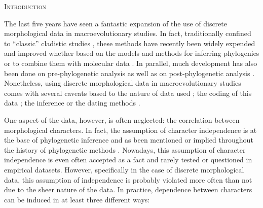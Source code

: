 \documentclass[12pt,letterpaper]{article}
\renewcommand{\section}[1]{%
\bigskip
\begin{center}
\begin{Large}
\normalfont\scshape #1
\medskip
\end{Large}
\end{center}}
\begin{document}
\section{Introduction}

The last five years have seen a fantastic expansion of the use of discrete morphological data in macroevolutionary studies.
In fact, traditionally confined to ``classic'' cladistic studies \citep{felsenstein2004inferring}, these methods have recently been widely expended and improved whether based on the models and methods for inferring phylogenies \citep[e.g.][]{heath2014fossilized,Wright01072016} or to combine them with molecular data \citep{pyrondivergence2011,ronquista2012}.
In parallel, much development has also been done on pre-phylogenetic analysis \citep[e.g. data collection;][]{morphobank} as well as on post-phylogenetic analysis \citep[e.g. morphological disparity analysis;][]{Close2015,Claddis}.
Nonetheless, using discrete morphological data in macroevolutionary studies comes with several caveats based to the nature of data used \citep{Guillerme2016146,bapst2017combined}; the coding of this data \citep{Brazeau2011}; the inference \citep{spencerefficacy2013,wrightbayesian2014,OReilly20160081,puttick2017uncertain,goloboff2017weighted} or the dating methods \citep{Arcila2015131,o2016tips}.

One aspect of the data, however, is often neglected: the correlation between morphological characters.
In fact, the assumption of character independence is at the base of phylogenetic inference and as been mentioned or implied throughout the history of phylogenetic methods \citep[e.g.][]{joysey1982problems,felsenstein1985phylogenies,lewisa2001,felsenstein2004inferring}.
Nowadays, this assumption of character independence is even often accepted as a fact and rarely tested or questioned in empirical datasets.
However, specifically in the case of discrete morphological data, this assumption of independence is probably violated more often than not due to the sheer nature of the data. In practice, dependence between characters can be induced in at least three different ways:
\end{document}
